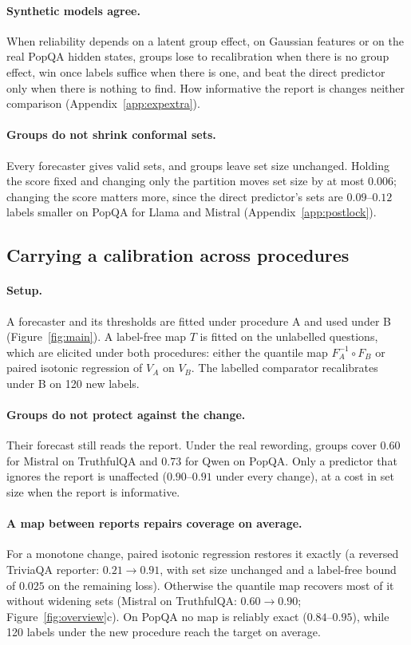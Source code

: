 \documentclass[twoside]{article}
\theoremstyle{definition}
\theoremstyle{remark}
\newcommand{\1}{\mathbf{1}}
\begin{document}
\paragraph{Synthetic models agree.} When reliability depends on a latent group effect, on Gaussian features or
on the real PopQA hidden states, groups lose to recalibration when there is no group effect, win once labels
suffice when there is one, and beat the direct predictor only when there is nothing to find. How informative
the report is changes neither comparison (Appendix~\ref{app:expextra}).

\paragraph{Groups do not shrink conformal sets.} Every forecaster gives valid sets, and groups leave set size
unchanged. Holding the score fixed and changing only the partition moves set size by at most $0.006$; changing
the score matters more, since the direct predictor's sets are $0.09$--$0.12$ labels smaller on PopQA for Llama
and Mistral (Appendix~\ref{app:postlock}).

\subsection{Carrying a calibration across procedures}
\label{sec:exp-transport}
\paragraph{Setup.} A forecaster and its thresholds are fitted under procedure A and used under B
(Figure~\ref{fig:main}). A label-free map $T$ is fitted on the unlabelled questions, which are elicited under
both procedures: either the quantile map $F_A^{-1}\circ F_B$ or paired isotonic regression of $V_A$ on $V_B$.
The labelled comparator recalibrates under B on 120 new labels.

\paragraph{Groups do not protect against the change.} Their forecast still reads the report. Under the real
rewording, groups cover $0.60$ for Mistral on TruthfulQA and $0.73$ for Qwen on PopQA. Only a predictor that
ignores the report is unaffected ($0.90$--$0.91$ under every change), at a cost in set size when the report is
informative.

\paragraph{A map between reports repairs coverage on average.} For a monotone change, paired isotonic regression
restores it exactly (a reversed TriviaQA reporter: $0.21\to0.91$, with set size unchanged and a label-free bound
of $0.025$ on the remaining loss). Otherwise the quantile map recovers most of it without widening sets
(Mistral on TruthfulQA: $0.60\to0.90$; Figure~\ref{fig:overview}c). On PopQA no map is reliably exact
($0.84$--$0.95$), while 120 labels under the new procedure reach the target on average.
\end{document}
